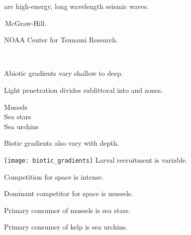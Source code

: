 \documentclass[t,handout]{beamer}  %
\begin{document}
{
\begin{frame}[b]{ are high-energy, long wavelength seismic waves.}

\hfill\tiny\textcopyright\,McGraw-Hill.
\end{frame}
}


{
\begin{frame}[b]

\hfill\tiny NOAA Center for Tsunami Research.
\end{frame}
}



{
\begin{frame}[b]

\hfill\tiny\textcolor{white}{Sue Scott, Darwin Initiative, Flickr Creative Commons.}
\end{frame}
}

{
\begin{frame}[t]{Abiotic gradients vary shallow to deep.}

\end{frame}
}

{
\begin{frame}[t]{Light penetration divides sublittoral into  and  zones.}

\vspace{13mm}
\hspace{97mm} Mussels \\
\hspace{97mm} Sea stars \\
\hspace{97mm} Sea urchins

\end{frame}
}

\begin{frame}[t]{Biotic gradients also vary with depth.}
\begin{multicols}{2}
	\texttt{[image: biotic\_gradients]}
\columnbreak
	\hangpara Larval recruitment is variable.
	
	\hangpara Competition for space is intense.
	
	\hangpara Dominant competitor for space is mussels.

	\hangpara Primary consumer of mussels is sea stars.

	\hangpara Primary consumer of kelp is sea urchins.
	
\end{multicols}
\end{frame}
\end{document}
